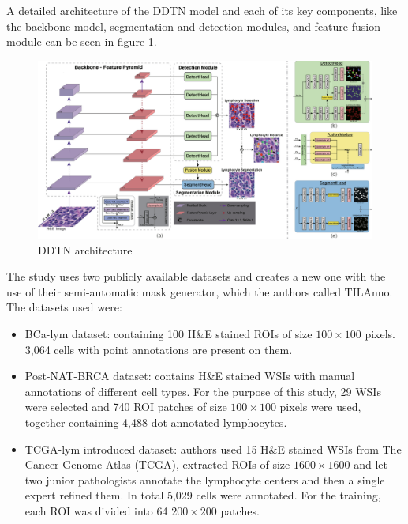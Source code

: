 A detailed architecture of the DDTN model and each of its key components, like the backbone model, segmentation and detection modules, and feature fusion module can be seen in figure \ref{fig:rw-ddtn-arch}.

\begin{figure}[H]
    \begin{centering}
    \includegraphics[width=14cm]{assets/images/rw-ddtn-architecture.jpg}
    \par\end{centering}
    \caption{DDTN architecture}
    \label{fig:rw-ddtn-arch}
\end{figure}

The study uses two publicly available datasets and creates a new one with the use of their semi-automatic mask generator, which the authors called TILAnno. The datasets used were:

\begin{itemize}
    \item BCa-lym dataset: containing 100 H\&E stained ROIs of size $100\!\times\!100$ pixels. 3,064 cells with point annotations are present on them.
    \item Post-NAT-BRCA dataset: contains H\&E stained WSIs with manual annotations of different cell types. For the purpose of this study, 29 WSIs were selected and 740 ROI patches of size $100\!\times\!100$ pixels were used, together containing 4,488 dot-annotated lymphocytes.
    \item TCGA-lym introduced dataset: authors used 15 H\&E stained WSIs from The Cancer Genome Atlas (TCGA), extracted ROIs of size $1600\!\times\!1600$ and let two junior pathologists annotate the lymphocyte centers and then a single expert refined them. In total 5,029 cells were annotated. For the training, each ROI was divided into 64 $200\!\times\!200$ patches.
\end{itemize}

